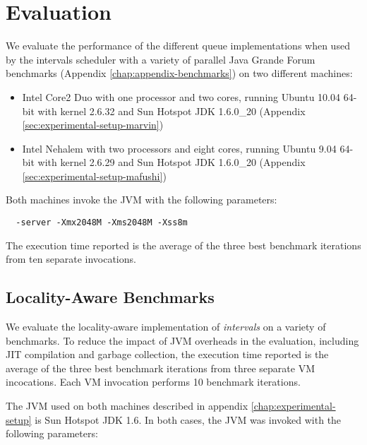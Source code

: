 
\chapter{Evaluation}
\label{chap:locality-evaluation}

We evaluate the performance of the different queue implementations
when used by the intervals scheduler with a variety of parallel Java
Grande Forum benchmarks (Appendix \ref{chap:appendix-benchmarks}) on
two different machines:

\begin{itemize}
\item Intel Core2 Duo with one processor and two cores, running Ubuntu
  10.04 64-bit with kernel 2.6.32 and Sun Hotspot JDK 1.6.0\_20
  (Appendix \ref{sec:experimental-setup-marvin})
\item Intel Nehalem with two processors and eight cores, running
  Ubuntu 9.04 64-bit with kernel 2.6.29 and Sun Hotspot JDK 1.6.0\_20
  (Appendix \ref{sec:experimental-setup-mafushi})
\end{itemize}

Both machines invoke the JVM with the following parameters:

\begin{lstlisting}
  -server -Xmx2048M -Xms2048M -Xss8m
\end{lstlisting}

The execution time reported is the average of the three best benchmark
iterations from ten separate invocations.


\section{Locality-Aware Benchmarks}

We evaluate the locality-aware implementation of \emph{intervals} on a
variety of benchmarks. To reduce the impact of JVM overheads in the
evaluation, including JIT compilation and garbage collection, the
execution time reported is the average of the three best benchmark
iterations from three separate VM incocations. Each VM invocation
performs 10 benchmark iterations.

The JVM used on both machines described in appendix
\ref{chap:experimental-setup} is Sun Hotspot JDK 1.6. In both cases,
the JVM was invoked with the following parameters:

